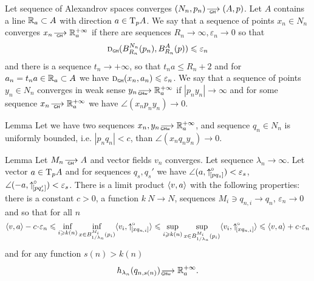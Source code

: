 \documentclass[a4paper,10pt]{article}
\begin{document}
Let sequence of Alexandrov spaces converges
$(N_n,p_n)\GHto (A,p)$.
 Let $A$ contains a line $\mathbb{R}_a\subset A$
 with direction
$a\in \text{\rm T}_p A$.
We say that a sequence of points  $x_n\in N_n$
converges $x_n\GHto\RR_a^{+\infty}$ if
there are sequences $R_n\to\infty,\varepsilon_n\to 0$
so that
$$\text{\sc d}_{\text{\sf\tiny GH}}(B^{N_n}_{R_n}(p_n), B^{A}_{R_n}(p))\leqslant\varepsilon_n$$
and there is a sequence $t_n\to+\infty$,
so that
$t_n a\le R_n+2$ and
 for $a_n=t_n a\in \mathbb{R}_a\subset A$
we have
$\text{\sc d}_{\text{\sf\tiny GH}}(x_n,a_n)\leqslant\varepsilon_n$.
We say that a sequence of points  $y_n\in N_n$
converges in weak sense $y_n\GHwto\RR_a^{+\infty}$ if
$|p_n y_n|\to \infty$ and
for some sequence
$x_n\GHto\RR_a^{+\infty}$ we have $\angle (x_n p_n y_n)\to 0$.

\begin{thm}{Lemma}\label{lem:angle}
Let we have two sequences $x_n, y_n\GHwto\RR_a^{+\infty}$,
and  sequence $q_n\in N_n$ is uniformly bounded, i.e. $|p_n q_n|<c$,
than $\angle (x_n q_n y_n)\to 0$.
\end{thm}




\begin{thm}{Lemma} \label{lem:vconvergLoc}
Let $M_n\GHto A$ and vector fields $v_n$ converges.
Let sequence $\lambda_n\to\infty$.
Let vector $a\in \text{\rm T}_p A$
and for sequences $q_s, q_s'$
we have $\angle (a,{\uparrow}_{\hskip-0.15em[{p}{q_s}]}^{\hspace{-0.1ex}\circ})<\varepsilon_s$,
 $\angle (-a,{\uparrow}_{\hskip-0.15em[{p}{q'_s}]}^{\hspace{-0.1ex}\circ})<\varepsilon_s$.
There is a  limit product $\langle v,a\rangle$
with the following properties:
there is a constant $c>0$,
a function $k\: N\to N$,
 sequences
$M_i\ni q_{n,i}\to q_n$, $\varepsilon_n\to 0$
and
so that for   all $n$
$$\<v,a\>- c\cdot \varepsilon_n
\le
\inf_{i\ge k(n)}\inf_{x\in B_{1/\lambda_n}^{M_i}(p_i)} \< v_i,\dir{x}{q_{n,i}}\>
\le
\sup_{i\ge k(n)}\sup_{x\in B_{1/\lambda_n}^{M_i}(p_i)}  \< v_i,\dir{x}{q_{n,i}}\>\le
\<v,a\>+
 c\cdot \varepsilon_n$$
and for any function $s(n)>k(n)$
$$h_{\lambda_n}( q_{n,s(n)})\GHwto\RR_a^{+\infty}.$$

\end{thm}
\end{document}
